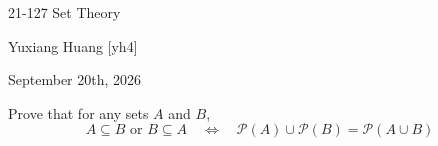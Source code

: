 \documentclass[11pt]{article}
\newif\ifSHOWSOLUTION
\newcommand{\showsolution}[1]{\par
  \ifSHOWSOLUTION
  \textbf{\textcolor{blue}{Solution.}} {\color{blue}#1}
  \fi
}
\begin{document}
\begin{center}
  {\LARGE 21-127 Set Theory

    \large Yuxiang Huang [yh4]

  September 20th, 2026}
\end{center}

Prove that for any sets $A$ and $B$,
$$
A \subseteq B \text{ or } B \subseteq A
\quad \Longleftrightarrow \quad
\mathcal{P}(A) \cup \mathcal{P}(B) = \mathcal{P}(A \cup B)
$$

\newpage
\showsolution{
  Let $A$ and $B$ be sets.
  \begin{itemize}
    \item[$(\Rightarrow):$] Assume $A \subseteq B$ or
      $B \subseteq A$.
      \begin{itemize}
        \item[$(\subseteq):$] Let
          $X \in \mathcal{P}(A) \cup \mathcal{P}(B)$.
          By def of set union, we have
          $X \in \mathcal{P}(A)$ or $X \in \mathcal{P}(B)$.
          By def of power set, we have
          $X \subseteq A$ or $X \subseteq B$.
          In either case, we have
          $X \subseteq A \cup B$. Therefore,
          $X \in \mathcal{P}(A \cup B)$.

        \item[$(\supseteq):$] Let $X \in \mathcal{P}(A \cup B)$.
          By def of power set, we have
          $X \subseteq A \cup B$.
          \begin{itemize}
            \item Case 1: $A \subseteq B$. Then
              $A \cup B = B$, so $X \subseteq B$.
              By def of power set, we have
              $X \in \mathcal{P}(B)$. By def of set union, we have
              $X \in \mathcal{P}(A) \cup \mathcal{P}(B)$.

            \item Case 2: $B \subseteq A$. Then
              $A \cup B = A$, so $X \subseteq A$. By def of power set, we have
              $X \in \mathcal{P}(A)$. By def of set union, we have
              $X \in \mathcal{P}(A) \cup \mathcal{P}(B)$.
          \end{itemize}
          Thus, in either case, $X \in \mathcal{P}(A) \cup \mathcal{P}(B)$.
      \end{itemize}

    \item[$(\Leftarrow):$] Assume
      $\mathcal{P}(A) \cup \mathcal{P}(B) = \mathcal{P}(A \cup B)$.

      AFSOC $A \nsubseteq B$ and
      $B \nsubseteq A$. Then there exist $a \in A \setminus B$ and
      $b \in B \setminus A$. Since $\{a,b\} \subseteq A \cup B$,
      by def of power set, we have
      $\{a,b\} \in \mathcal{P}(A \cup B)$.


\end{itemize}}
\end{document}
